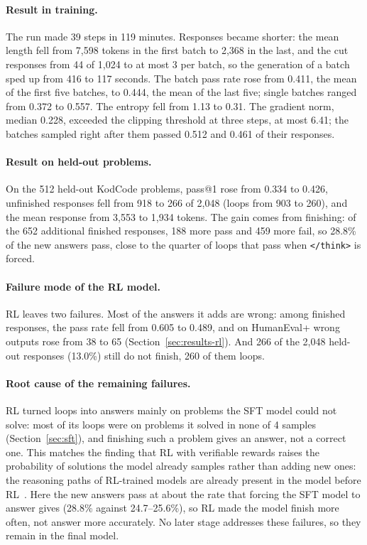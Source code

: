 \documentclass[sigconf,nonacm,balance=false]{acmart}
\begin{document}
\paragraph{Result in training.} The run made 39 steps in 119 minutes. Responses became shorter: the mean length fell
from 7,598 tokens in the first batch to 2,368 in the last, and the cut responses from 44 of 1,024 to at most 3 per
batch, so the generation of a batch sped up from 416 to 117 seconds. The batch pass rate rose from 0.411, the mean of
the first five batches, to 0.444, the mean of the last five; single batches ranged from 0.372 to 0.557. The entropy
fell from 1.13 to 0.31. The gradient norm, median 0.228, exceeded the clipping threshold at three steps, at most 6.41;
the batches sampled right after them passed 0.512 and 0.461 of their responses.

\paragraph{Result on held-out problems.} On the 512 held-out KodCode problems, pass@1 rose from 0.334 to 0.426,
unfinished responses fell from 918 to 266 of 2,048 (loops from 903 to 260), and the mean response from 3,553 to 1,934
tokens. The gain comes from finishing: of the 652 additional finished responses, 188 more pass and 459 more fail, so
28.8\% of the new answers pass, close to the quarter of loops that pass when \texttt{</think>} is forced.

\paragraph{Failure mode of the RL model.} RL leaves two failures. Most of the answers it adds are wrong: among
finished responses, the pass rate fell from 0.605 to 0.489, and on HumanEval+ wrong outputs rose from 38 to 65
(Section~\ref{sec:results-rl}). And 266 of the 2,048 held-out responses (13.0\%) still do not finish, 260 of them
loops.

\paragraph{Root cause of the remaining failures.} RL turned loops into answers mainly on problems the SFT model could
not solve: most of its loops were on problems it solved in none of 4 samples (Section~\ref{sec:sft}), and finishing
such a problem gives an answer, not a correct one. This matches the finding that RL with verifiable rewards raises
the probability of solutions the model already samples rather than adding new ones: the reasoning paths of RL-trained
models are already present in the model before RL~\cite{yue2025rlvr}. Here the new answers pass at about the rate
that forcing the SFT model to answer gives (28.8\% against 24.7--25.6\%), so RL made the model finish more often, not
answer more accurately. No later stage addresses these failures, so they remain in the final model.
\end{document}
